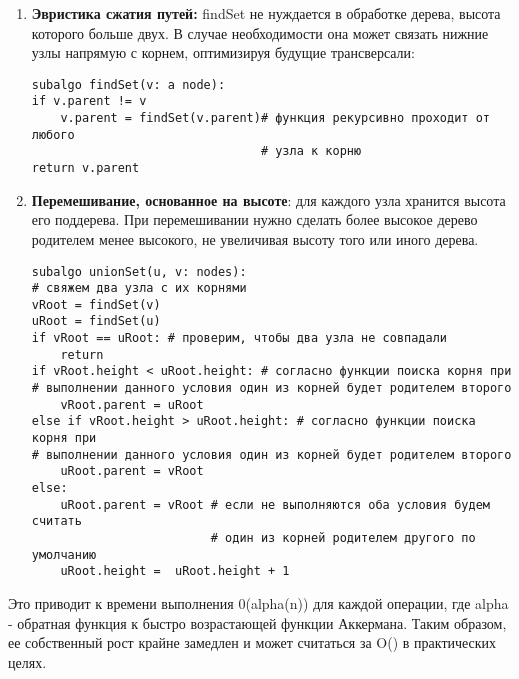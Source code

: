 \vspace{\baselineskip}
\begin{enumerate}
    \item \textbf{Эвристика сжатия путей:} findSet не нуждается в обработке дерева, высота которого больше двух. В случае необходимости она может связать нижние узлы напрямую с корнем, оптимизируя будущие трансверсали: 
    
    \vspace{\baselineskip}
    \begin{tcolorbox}
    \begin{verbatim}
subalgo findSet(v: a node):
if v.parent != v
    v.parent = findSet(v.parent)# функция рекурсивно проходит от любого 
                                # узла к корню
return v.parent
    \end{verbatim}
    \end{tcolorbox}
    
    \item \textbf{Перемешивание, основанное на высоте}: для каждого узла хранится высота его поддерева. При перемешивании нужно сделать более высокое дерево родителем менее высокого, не увеличивая высоту того или иного дерева.
    
    \vspace{\baselineskip}
    \begin{tcolorbox}
    \begin{verbatim}
subalgo unionSet(u, v: nodes):
# свяжем два узла с их корнями
vRoot = findSet(v)
uRoot = findSet(u)
if vRoot == uRoot: # проверим, чтобы два узла не совпадали
    return
if vRoot.height < uRoot.height: # согласно функции поиска корня при 
# выполнении данного условия один из корней будет родителем второго
    vRoot.parent = uRoot
else if vRoot.height > uRoot.height: # согласно функции поиска корня при 
# выполнении данного условия один из корней будет родителем второго
    uRoot.parent = vRoot
else:
    uRoot.parent = vRoot # если не выполняются оба условия будем считать 
                         # один из корней родителем другого по умолчанию
    uRoot.height =  uRoot.height + 1
    \end{verbatim}
    \end{tcolorbox} 
    
\end{enumerate}

\vspace{\baselineskip}
Это приводит к времени выполнения 0(alpha(n)) для каждой операции, где alpha - обратная функция к быстро возрастающей функции Аккермана. Таким образом, ее собственный рост крайне замедлен и может считаться за O()  в практических целях.

